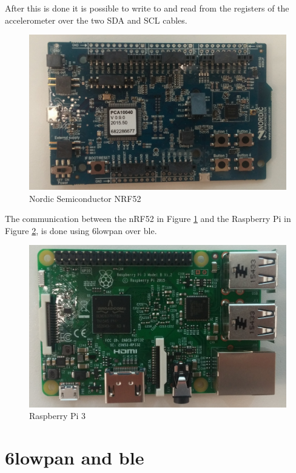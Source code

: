 After this is done it is possible to write to and read from the registers of the accelerometer over the two SDA and SCL cables. 

\begin{figure}[h]
    \centering
    \includegraphics[scale=0.32]{nrf52.png}    \caption{Nordic Semiconductor NRF52}
    \label{fig:nrf52picture}
\end{figure}

The communication between the nRF52 in Figure \ref{fig:nrf52picture} and the Raspberry Pi in Figure \ref{fig:piPicture}, is done using \gls{6lowpan} over \gls{ble}. 

\begin{figure}[h]
    \centering
    \includegraphics[scale=0.35]{pi3.png}    \caption{Raspberry Pi 3}
    \label{fig:piPicture}
\end{figure}




\section{\gls{6lowpan} and \gls{ble}}



